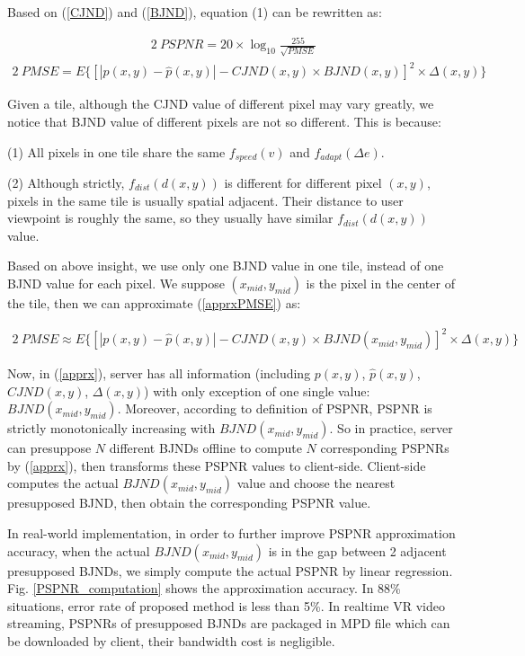 Based on (\ref{CJND}) and (\ref{BJND}), equation (1) can be rewritten as:

\begin{alignat}{2}\
\label{f1} PSPNR = 20 \times \log_{10}\frac{255}{\sqrt{PMSE}}
\end{alignat}
\begin{alignat}{2}\
PMSE=E\{ \left[ |p(x, y) - \hat{p}(x, y)| - CJND(x, y) \times BJND(x, y)\right]^2 \times \Delta (x, y)\} \label{apprxPMSE}
\end{alignat} 

Given a tile, although the CJND value of different pixel may vary greatly, we notice that BJND value of different pixels are not so different. This is because:

 (1) All pixels in one tile share the same $f_{speed}(v)$ and $f_{adapt}(\Delta e)$. 
 
 (2) Although strictly, $f_{dist}(d(x, y))$ is different for different pixel $(x, y)$, pixels in the same tile is usually spatial adjacent. Their distance to user viewpoint is roughly the same, so they usually have similar $f_{dist}(d(x, y))$ value.

Based on above insight, we use only one BJND value in one tile, instead of one BJND value for each pixel. We suppose $(x_{mid}, y_{mid})$ is the pixel in the center of the tile, then we can approximate (\ref{apprxPMSE}) as:

\begin{alignat}{2}\
PMSE \approx E\{ \left[ |p(x, y) - \hat{p}(x, y)| - CJND(x, y) \times BJND(x_{mid}, y_{mid})\right]^2 \times \Delta (x, y)\} \label{apprx}
\end{alignat} 

Now, in (\ref{apprx}), server has all information (including $p(x, y)$, $\hat{p}(x, y)$, $CJND(x, y)$, $\Delta (x, y)$) with only exception of one single value: $BJND(x_{mid}, y_{mid})$. Moreover, according to definition of PSPNR, PSPNR is strictly monotonically increasing with $BJND(x_{mid}, y_{mid})$. So in practice, server can presuppose $N$ different BJNDs offline to compute $N$ corresponding PSPNRs by (\ref{apprx}), then transforms these PSPNR values to client-side. Client-side computes the actual $BJND(x_{mid}, y_{mid})$ value and choose the nearest presupposed BJND, then obtain the corresponding PSPNR value.

In real-world implementation, in order to further improve PSPNR approximation accuracy, when the actual $BJND(x_{mid}, y_{mid})$ is in the gap between 2 adjacent presupposed BJNDs, we simply compute the actual PSPNR by linear regression. Fig. \ref{PSPNR_computation} shows the approximation accuracy. In 88\% situations, error rate of proposed method is less than 5\%. In realtime VR video streaming, PSPNRs of presupposed BJNDs are packaged in MPD file which can be downloaded by client, their bandwidth cost is negligible.

